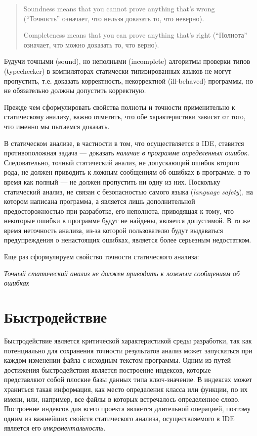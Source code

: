 \begin{quote}
Soundness means that you cannot prove anything that's wrong (``Точность'' означает,
что нельзя доказать то, что неверно).

Completeness means that you can prove anything that's right (``Полнота'' означает,
что можно доказать то, что верно).
\end{quote}

Будучи точными (sound), но неполными (incomplete) алгоритмы проверки типов
(typechecker) в компиляторах статически типизированных языков не могут
пропустить, т.е. доказать корректность, некорректной (ill-behaved) программы, но
не обязательно должны допустить корректную.

Прежде чем сформулировать свойства полноты и точности применительно к
статическому анализу, важно отметить, что обе характеристики зависят от того,
что именно мы пытаемся доказать.

В статическом анализе, в частности в том, что осуществляется в IDE, ставится
противоположная задача --- доказать \emph{наличие в программе определенных
  ошибок}.  Следовательно, точный статический анализ, не допускающий ошибок
второго рода, не должен приводить к ложным сообщениям об ошибках в программе, в
то время как полный --- не должен пропустить ни одну из них. Поскольку
статический анализ, не связан с безопасностью самого языка (\emph{language
  safety}), на котором написана программа, а является лишь дополнительной
предосторожностью при разработке, его неполнота, приводящая к тому, что
некоторые ошибки в программе будут не найдены, является допустимой. В то же
время неточность анализа, из-за которой пользователю будут выдаваться
предупреждения о ненастоящих ошибках, является более серьезным недостатком.

Еще раз сформулируем свойство точности статического анализа:

\emph{Точный статический анализ не должен приводить к ложным сообщениям об 
ошибках}

\section{Быстродействие}
\label{sec:performance-requirement}

Быстродействие является критической характеристикой среды разработки, так как
потенциально для сохранения точности результатов анализ может запускаться при
каждом изменении файла с исходным текстом программы. Одним из путей достижения
быстродействия является построение индексов, которые представляют собой плоские
базы данных типа ключ-значение. В индексах может храниться такая информация, как
место определения класса или функции, по их имени, или, например, все файлы в
которых встречалось определенное слово. Построение индексов для всего проекта
является длительной операцией, поэтому одним из важнейших свойств статического
анализа, осуществляемого в IDE является его \emph{инкрементальность}.

